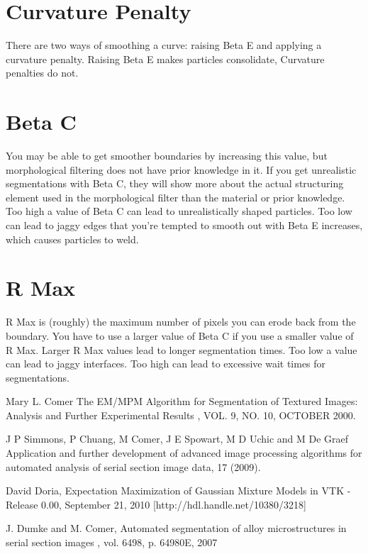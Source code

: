 \documentclass[12pt,oneside]{book}
\begin{document}
\section{Curvature Penalty}
There are two ways of smoothing a curve: raising Beta E and applying a curvature penalty. Raising Beta E makes particles consolidate, Curvature penalties do not.
\section{Beta C}
You may be able to get smoother boundaries by increasing this value, but morphological filtering does not have prior knowledge in it. If you get unrealistic segmentations with Beta C, they will show more about the actual structuring element used in the morphological filter than the material or prior knowledge. Too high a value of Beta C can lead to unrealistically shaped particles. Too low can lead to jaggy edges that you're tempted to smooth out with Beta E increases, which causes particles to weld.
\section{R Max}
R Max is (roughly) the maximum number of pixels you can erode back from the boundary. You have to use a larger value of Beta C if you use a smaller value of R Max. Larger R Max values lead to longer segmentation times. Too low a value can lead to jaggy interfaces. Too high can lead to excessive wait times for segmentations.

\newpage
\begin{thebibliography}{4}

Mary L. Comer
\newblock The EM/MPM Algorithm for Segmentation of Textured Images: Analysis and Further Experimental Results
, VOL. 9, NO. 10, OCTOBER 2000.


J P Simmons, P Chuang, M Comer, J E Spowart, M D Uchic and M De Graef
\newblock Application and further development of advanced image processing algorithms for automated analysis of serial section image data, 
 17 (2009). 


David Doria, 
\newblock Expectation Maximization of Gaussian Mixture Models in VTK - Release 0.00, September 21, 2010
 [http://hdl.handle.net/10380/3218] 


J. Dumke and M. Comer, 
\newblock Automated segmentation of alloy microstructures in serial section images
, vol. 6498, p. 64980E, 2007

\end{thebibliography}
% 

\printindex
\end{document}
